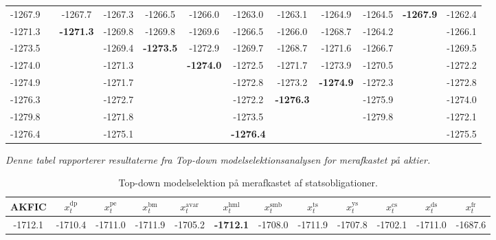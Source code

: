 \documentclass[
  a4paper,
  oneside]{memoir}
\begin{document}
\begin{landscape}
\begin{table}[H]
\begin{threeparttable}
\begin{tabular}[t]{cccccccccccc}
-1267.9 &  & -1267.7 & -1267.3 & -1266.5 & -1266.0 & -1263.0 & -1263.1 & -1264.9 & -1264.5 & \textbf{-1267.9} & -1262.4\\
 
\rowcolor{gray!6}  -1271.3 &  & \textbf{-1271.3} & -1269.8 & -1269.8 & -1269.6 & -1266.5 & -1266.0 & -1268.7 & -1264.2 &  & -1266.1\\
 
-1273.5 &  &  & -1269.4 & \textbf{-1273.5} & -1272.9 & -1269.7 & -1268.7 & -1271.6 & -1266.7 &  & -1269.5\\
 
\rowcolor{gray!6}  -1274.0 &  &  & -1271.3 &  & \textbf{-1274.0} & -1272.5 & -1271.7 & -1273.9 & -1270.5 &  & -1272.2\\
 
-1274.9 &  &  & -1271.7 &  &  & -1272.8 & -1273.2 & \textbf{-1274.9} & -1272.3 &  & -1272.8\\
 
\rowcolor{gray!6}  -1276.3 &  &  & -1272.7 &  &  & -1272.2 & \textbf{-1276.3} &  & -1275.9 &  & -1274.0\\
 
-1279.8 &  &  & -1271.8 &  &  & -1273.5 &  &  & -1279.8 &  & -1272.1\\
 
\rowcolor{gray!6}  -1276.4 &  &  & -1275.1 &  &  & \textbf{-1276.4} &  &  &  &  & -1275.5\\
\bottomrule
\end{tabular}
\begin{tablenotes}
\item \textit{Denne tabel rapporterer resultaterne fra \textit{Top-down} modelselektionsanalysen for merafkastet på aktier.}
\end{tablenotes}
\end{threeparttable}
\end{table}

\begin{table}[H]

\caption{\label{tab:STEP-S-TABLE}Top-down modelselektion på merafkastet af statsobligationer.}
\centering
\begin{threeparttable}
\begin{tabular}[t]{cccccccccccc}
\toprule
AKFIC & $x_t^{\text{dp}}$ & $x_t^{\text{pe}}$ & $x_t^{\text{bm}}$ & $x_t^{\text{avar}}$ & $x_t^{\text{hml}}$ & $x_t^{\text{smb}}$ & $x_t^{\text{ts}}$ & $x_t^{\text{ys}}$ & $x_t^{\text{cs}}$ & $x_t^{\text{ds}}$ & $x_t^{\text{fr}}$\\
\midrule
\rowcolor{gray!6}  -1712.1 & -1710.4 & -1711.0 & -1711.9 & -1705.2 & \textbf{-1712.1} & -1708.0 & -1711.9 & -1707.8 & -1702.1 & -1711.0 & -1687.6\\
 

\end{tabular}
\end{threeparttable}
\end{table}
\end{landscape}
\end{document}
